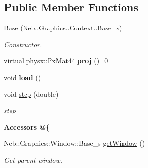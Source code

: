 \subsection*{\-Public \-Member \-Functions}
\begin{DoxyCompactItemize}
\item 
\hypertarget{classNeb_1_1Graphics_1_1Camera_1_1Projection_1_1Base_a8415a79bab5f015993d523292136bc24}{\hyperlink{classNeb_1_1Graphics_1_1Camera_1_1Projection_1_1Base_a8415a79bab5f015993d523292136bc24}{\-Base} (\-Neb\-::\-Graphics\-::\-Context\-::\-Base\-\_\-s)}\label{classNeb_1_1Graphics_1_1Camera_1_1Projection_1_1Base_a8415a79bab5f015993d523292136bc24}

\begin{DoxyCompactList}\small\item\em \-Constructor. \end{DoxyCompactList}\item 
\hypertarget{classNeb_1_1Graphics_1_1Camera_1_1Projection_1_1Base_af9049536481c480a55f0a5f1b0164911}{virtual physx\-::\-Px\-Mat44 {\bfseries proj} ()=0}\label{classNeb_1_1Graphics_1_1Camera_1_1Projection_1_1Base_af9049536481c480a55f0a5f1b0164911}

\item 
\hypertarget{classNeb_1_1Graphics_1_1Camera_1_1Projection_1_1Base_affb632f73663778165a5319d9dc00da5}{void {\bfseries load} ()}\label{classNeb_1_1Graphics_1_1Camera_1_1Projection_1_1Base_affb632f73663778165a5319d9dc00da5}

\item 
void \hyperlink{classNeb_1_1Graphics_1_1Camera_1_1Projection_1_1Base_ab6e4c68044df250829de3e0cc387de9c}{step} (double)
\begin{DoxyCompactList}\small\item\em step \end{DoxyCompactList}\end{DoxyCompactItemize}
\begin{Indent}{\bf \-Accessors @\{}\par
\begin{DoxyCompactItemize}
\item 
\hypertarget{classNeb_1_1Graphics_1_1Camera_1_1Projection_1_1Base_ac7f5565ffdf6bc88517303400813e4ad}{\-Neb\-::\-Graphics\-::\-Window\-::\-Base\-\_\-s \hyperlink{classNeb_1_1Graphics_1_1Camera_1_1Projection_1_1Base_ac7f5565ffdf6bc88517303400813e4ad}{get\-Window} ()}\label{classNeb_1_1Graphics_1_1Camera_1_1Projection_1_1Base_ac7f5565ffdf6bc88517303400813e4ad}

\begin{DoxyCompactList}\small\item\em \-Get parent window. \end{DoxyCompactList}\end{DoxyCompactItemize}
\end{Indent}
